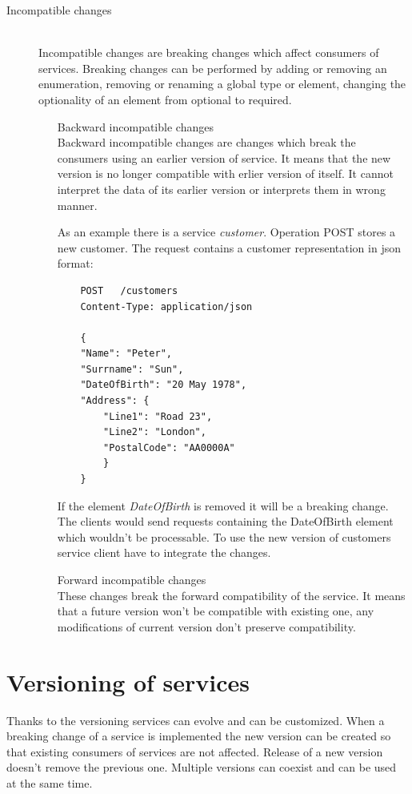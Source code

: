 \begin{description}
  \item[Incompatible changes] \hfill \\
  Incompatible changes are breaking changes which affect consumers of services. Breaking changes can be performed by adding or removing an enumeration, removing or renaming a global type or element, changing the optionality of an element from optional to required.
  \begin{enumerate} 
    \item[Backward incompatible changes]  \hfill \\
    Backward incompatible changes are changes which break the consumers using an earlier version of service. It means that the new version is no longer compatible with erlier version of itself. It cannot interpret the data of its earlier version or interprets them in wrong manner.
    
    As an example there is a service \emph{customer}. Operation POST stores a new customer. The request contains a customer representation in json format: 
    
\begin{lstlisting}
    POST   /customers
    Content-Type: application/json
    
    {
    "Name": "Peter",
    "Surrname": "Sun",
    "DateOfBirth": "20 May 1978",
    "Address": {
        "Line1": "Road 23",
        "Line2": "London",
        "PostalCode": "AA0000A"
        }
    }
\end{lstlisting}

If the element \emph{DateOfBirth} is removed it will be a breaking change. The clients would send requests containing the DateOfBirth element which wouldn't be processable. To use the new version of customers service client have to integrate the changes. 

    \item[Forward incompatible changes] \hfill \\
    These changes break the forward compatibility of the service. It means that a future version won't be compatible with existing one, any modifications of current version don't preserve compatibility.
  \end{enumerate}
\end{description}

\section{Versioning of services}
\label{sec:verioningservices}
Thanks to the versioning services can evolve and can be customized. When a breaking change of a service is implemented the new version can be created so that existing consumers of services are not affected. Release of a new version doesn't remove the previous one. Multiple versions can coexist and can be used at the same time. 

